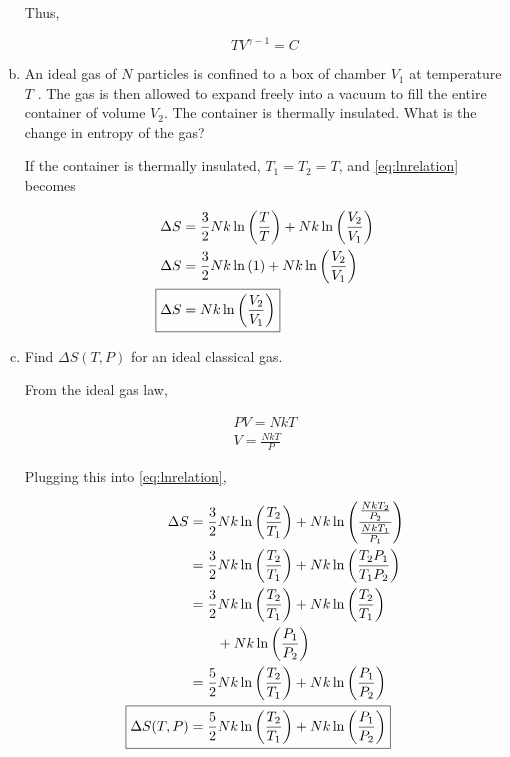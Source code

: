 \documentclass[9pt,a4paper,twocolumn]{article}
\begin{document}
\begin{enumerate}[(a)]
Thus,

\begin{equation}\label{eq:answer-a}
	\boxed{
	TV^{\gamma - 1} = C
	}
\end{equation}

\item An ideal gas of $N$ particles is confined to a box of chamber $V_1$ at temperature $T$ . The gas is then allowed to expand freely into a vacuum to fill the entire container of volume $V_2$. The container is thermally insulated. What is the change in entropy of the gas?

If the container is thermally insulated, $T_1 = T_2 = T$, and \eqref{eq:lnrelation} becomes

\begin{align}
	\Delta S &= \frac{3}{2} Nk \ln{\left( \frac{T}{T} \right)} + Nk \ln{\left(  \frac{V_2}{V_1} \right)} \nonumber \\
	\Delta S &= \frac{3}{2} Nk \ln{\left( 1 \right)} + Nk \ln{\left(  \frac{V_2}{V_1} \right)} \nonumber \\
	\Aboxed{
		\Delta S &= Nk \ln{\left(  \frac{V_2}{V_1} \right)}
	} \label{eq:answer-b}
\end{align}

\item Find $\Delta S(T, P)$ for an ideal classical gas.

From the ideal gas law,

\begin{align}
	PV = NkT \label{eq:idealgas} \\
	V = \frac{NkT}{P} \label{eq:idealvol}
\end{align}

Plugging this into \eqref{eq:lnrelation},

\begin{align}
	\Delta S &= \frac{3}{2} Nk \ln{\left( \frac{T_2}{T_1} \right)} + Nk \ln{\left(  \frac{\frac{NkT_2}{P_2}}{\frac{NkT_1}{P_1}} \right)} \nonumber \\
	&= \frac{3}{2} Nk \ln{\left( \frac{T_2}{T_1} \right)} + Nk \ln{\left(  \frac{T_2 P_1}{T_1 P_2} \right)} \nonumber \\
	&= \frac{3}{2} Nk \ln{\left( \frac{T_2}{T_1} \right)} + Nk \ln{\left(  \frac{T_2}{T_1} \right)} \nonumber \\
	&\qquad + Nk\ln{\left( \frac{P_1}{P_2} \right) } \nonumber \\
	&= \frac{5}{2} Nk \ln{\left( \frac{T_2}{T_1} \right)} + Nk \ln{\left(  \frac{P_1}{P_2} \right)} \nonumber \\
	\Aboxed{
		\Delta S(T,P) &= \frac{5}{2} Nk \ln{\left( \frac{T_2}{T_1} \right)} + Nk \ln{\left(  \frac{P_1}{P_2} \right)}
	} \label{eq:answer-c}
\end{align}

\end{enumerate}
\end{document}
